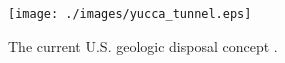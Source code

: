 \begin{figure}[htbp!]
  \begin{center}
    \texttt{[image: ./images/yucca\_tunnel.eps]}
  \end{center}
  \caption{The current U.S. geologic disposal concept \cite{peters_whats_2013}.}
  \label{fig:yucca_tunnel}
\end{figure}
